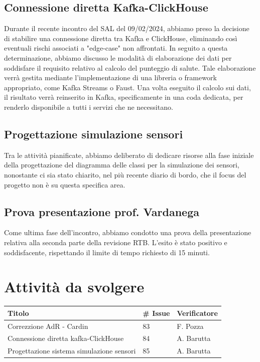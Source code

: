 \documentclass{article}
\begin{document}
\subsection{Connessione diretta Kafka-ClickHouse}
Durante il recente incontro del SAL del 09/02/2024, abbiamo preso la decisione di stabilire una connessione diretta tra Kafka e ClickHouse, eliminando così eventuali rischi associati a "edge-case" non affrontati. In seguito a questa determinazione, abbiamo discusso le modalità di elaborazione dei dati per soddisfare il requisito relativo al calcolo del punteggio di salute. Tale elaborazione verrà gestita mediante l'implementazione di una libreria o framework appropriato, come Kafka Streams o Faust. Una volta eseguito il calcolo sui dati, il risultato verrà reinserito in Kafka, specificamente in una coda dedicata, per renderlo disponibile a tutti i servizi che ne necessitano.

\subsection{Progettazione simulazione sensori}
Tra le attività pianificate, abbiamo deliberato di dedicare risorse alla fase iniziale della progettazione del diagramma delle classi per la simulazione dei sensori, nonostante ci sia stato chiarito, nel più recente diario di bordo, che il focus del progetto non è su questa specifica area.

\subsection{Prova presentazione prof. Vardanega}
Come ultima fase dell'incontro, abbiamo condotto una prova della presentazione relativa alla seconda parte della revisione RTB.
 L'esito è stato positivo e soddisfacente, rispettando il limite di tempo richiesto di 15 minuti.


\section{Attività da svolgere}
    \begin{center}
        \begin{tabular}{|C{7cm}|C{1,5cm}|C{3cm}|}
            \hline
            \textbf{Titolo} & \textbf{\# Issue} & \textbf{Verificatore} \\
            \hline\hline
            Correzzione AdR - Cardin & 83 & F. Pozza \\
            \hline
            Connessione diretta kafka-ClickHouse & 84 & A. Barutta \\
            \hline
            Progettazione sistema simulazione sensori & 85 & A. Barutta \\
            \hline
        \end{tabular}
    \end{center}
\end{document}
